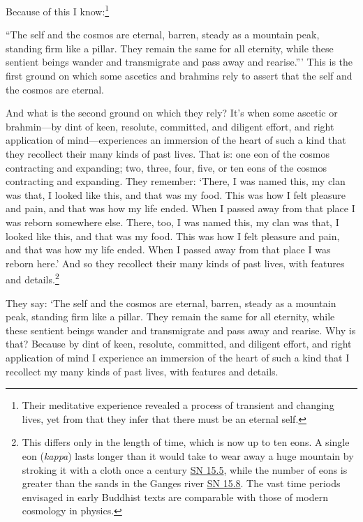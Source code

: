 \documentclass[12pt,openany]{book}%
\begin{document}
Because of this I know:\footnote{Their meditative experience revealed a process of transient and changing lives, yet from that they infer that there must be an eternal self. } 

“The self and the cosmos are eternal, barren, steady as a mountain peak, standing firm like a pillar. They remain the same for all eternity, while these sentient beings wander and transmigrate and pass away and rearise.”’ This is the first ground on which some ascetics and brahmins rely to assert that the self and the cosmos are eternal. 

And what is the second ground on which they rely? It’s when some ascetic or brahmin—by dint of keen, resolute, committed, and diligent effort, and right application of mind—experiences an immersion of the heart of such a kind that they recollect their many kinds of past lives. That is: one eon of the cosmos contracting and expanding; two, three, four, five, or ten eons of the cosmos contracting and expanding. They remember: ‘There, I was named this, my clan was that, I looked like this, and that was my food. This was how I felt pleasure and pain, and that was how my life ended. When I passed away from that place I was reborn somewhere else. There, too, I was named this, my clan was that, I looked like this, and that was my food. This was how I felt pleasure and pain, and that was how my life ended. When I passed away from that place I was reborn here.’ And so they recollect their many kinds of past lives, with features and details.\footnote{This differs only in the length of time, which is now up to ten eons. A single eon (\textit{kappa}) lasts longer than it would take to wear away a huge mountain by stroking it with a cloth once a century \href{https://suttacentral.net/sn15.5/en/sujato}{SN 15.5}, while the number of eons is greater than the sands in the Ganges river \href{https://suttacentral.net/sn15.8/en/sujato}{SN 15.8}. The vast time periods envisaged in early Buddhist texts are comparable with those of modern cosmology in physics. } 

They say: ‘The self and the cosmos are eternal, barren, steady as a mountain peak, standing firm like a pillar. They remain the same for all eternity, while these sentient beings wander and transmigrate and pass away and rearise. Why is that? Because by dint of keen, resolute, committed, and diligent effort, and right application of mind I experience an immersion of the heart of such a kind that I recollect my many kinds of past lives, with features and details. 
\end{document}
